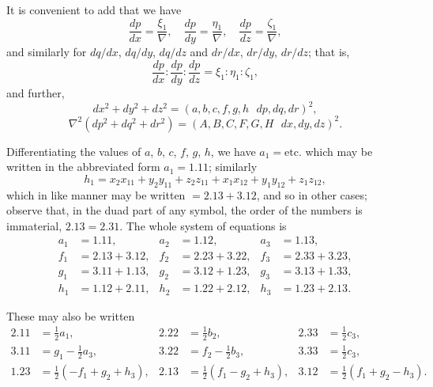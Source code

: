 \documentclass[11pt,a4paper]{book}
\begin{document}
It is convenient to add that we have
\[
\frac{dp}{dx} = \frac{\xi_1}{\nabla}, \quad \frac{dp}{dy} = \frac{\eta_1}{\nabla}, \quad \frac{dp}{dz} = \frac{\zeta_1}{\nabla},
\]
and similarly for $dq/dx$, $dq/dy$, $dq/dz$ and $dr/dx$, $dr/dy$, $dr/dz$; that is,
\[
\frac{dp}{dx} : \frac{dp}{dy} : \frac{dp}{dz} = \xi_1 : \eta_1 : \zeta_1,
\]
and further,
\[
dx^2 + dy^2 + dz^2 = (a, b, c, f, g, h \,\!\!\!\!\!\! \, \, \, d p, dq, dr)^2,
\]
\[
\nabla^2(dp^2 + dq^2 + dr^2) = (A, B, C, F, G, H \,\!\!\!\!\!\! \, \, \, d x, dy, dz)^2.
\]

Differentiating the values of $a$, $b$, $c$, $f$, $g$, $h$, we have $a_1 = \text{etc.}$ which may be written in the abbreviated form $a_1 = 1.11$; similarly
\[
h_1 = x_2 x_{11} + y_2 y_{11} + z_2 z_{11} + x_1 x_{12} + y_1 y_{12} + z_1 z_{12},
\]
which in like manner may be written $= 2.13 + 3.12$, and so in other cases; observe that, in the duad part of any symbol, the order of the numbers is immaterial, $2.13 = 2.31$. The whole system of equations is
\[
\begin{aligned}
a_1 &= 1.11, & a_2 &= 1.12, & a_3 &= 1.13, \\
f_1 &= 2.13 + 3.12, & f_2 &= 2.23 + 3.22, & f_3 &= 2.33 + 3.23, \\
g_1 &= 3.11 + 1.13, & g_2 &= 3.12 + 1.23, & g_3 &= 3.13 + 1.33, \\
h_1 &= 1.12 + 2.11, & h_2 &= 1.22 + 2.12, & h_3 &= 1.23 + 2.13.
\end{aligned}
\]

These may also be written
\[
\begin{aligned}
2.11 &= \tfrac{1}{2}a_1, & 2.22 &= \tfrac{1}{2}b_2, & 2.33 &= \tfrac{1}{2}c_3, \\
3.11 &= g_1 - \tfrac{1}{2}a_3, & 3.22 &= f_2 - \tfrac{1}{2}b_3, & 3.33 &= \tfrac{1}{2}c_3, \\
1.23 &= \tfrac{1}{2}(-f_1 + g_2 + h_3), & 2.13 &= \tfrac{1}{2}(f_1 - g_2 + h_3), & 3.12 &= \tfrac{1}{2}(f_1 + g_2 - h_3).
\end{aligned}
\]
\end{document}
